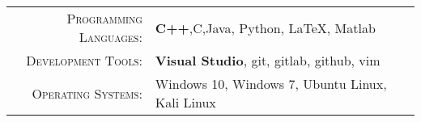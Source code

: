 %
%
%
\renewcommand{\arraystretch}{1.1}

	\begin{tabular}{>{\small}r>{\small}p{13cm}} 
		\textsc{Programming Languages:}  		&   \textbf{C++},C,Java, Python, LaTeX, Matlab\\ 
		\textsc{Development Tools:}	  		&  \textbf{Visual Studio}, git, gitlab, github, vim\\
		\textsc{Operating Systems:}	        &   Windows 10, Windows 7, Ubuntu Linux, Kali Linux\\ 
	\end{tabular}
    